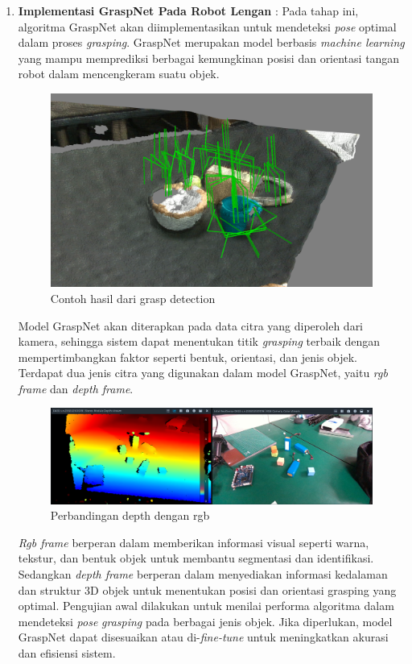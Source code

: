 \begin{enumerate}
  \item \textbf{Implementasi GraspNet Pada Robot Lengan} : Pada tahap ini, algoritma GraspNet
  akan diimplementasikan untuk mendeteksi \emph{pose} optimal dalam proses \emph{grasping}.
  GraspNet merupakan model berbasis \emph{machine learning} yang mampu memprediksi berbagai
  kemungkinan posisi dan orientasi tangan robot dalam mencengkeram suatu objek.
  \begin{figure} [H] \centering
    \includegraphics[scale=0.15]{gambar/contoh_hasil_graspdetect.png}
    \caption{Contoh hasil dari grasp detection\parencite{img_result_graspdetect}}
    \label{fig:graspdetect result}
  \end{figure}
  Model GraspNet akan diterapkan pada data citra yang diperoleh dari kamera, sehingga sistem dapat menentukan
  titik \emph{grasping} terbaik dengan mempertimbangkan faktor seperti bentuk, orientasi, dan jenis objek.
  Terdapat dua jenis citra yang digunakan dalam model GraspNet, yaitu \emph{rgb frame} dan \emph{depth frame}.
  \begin{figure} [H] \centering
    \includegraphics[scale=0.3]{gambar/depth_rgb.png}
    \caption{Perbandingan depth dengan rgb}
    \label{fig:depth_rgb}
  \end{figure}
  \emph{Rgb frame} berperan dalam memberikan informasi visual seperti warna, tekstur, dan bentuk objek
  untuk membantu segmentasi dan identifikasi. Sedangkan \emph{depth frame} berperan dalam menyediakan
  informasi kedalaman dan struktur 3D objek untuk menentukan posisi dan orientasi grasping yang optimal.
  Pengujian awal dilakukan untuk menilai performa algoritma dalam mendeteksi \emph{pose} \emph{grasping}
  pada berbagai jenis objek. Jika diperlukan, model GraspNet dapat disesuaikan atau
  di-\emph{fine-tune} untuk meningkatkan akurasi dan efisiensi sistem.


\end{enumerate}
